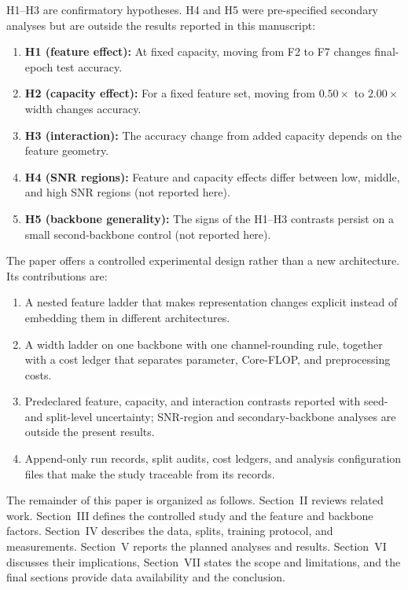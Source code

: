 H1--H3 are confirmatory hypotheses. H4 and H5 were pre-specified secondary
analyses but are outside the results reported in this manuscript:
\begin{enumerate}
  \item \textbf{H1 (feature effect):} At fixed capacity, moving from F2 to F7 changes final-epoch test accuracy.
  \item \textbf{H2 (capacity effect):} For a fixed feature set, moving from $0.50\times$ to $2.00\times$ width changes accuracy.
  \item \textbf{H3 (interaction):} The accuracy change from added capacity depends on the feature geometry.
  \item \textbf{H4 (SNR regions):} Feature and capacity effects differ between low, middle, and high SNR regions (not reported here).
  \item \textbf{H5 (backbone generality):} The signs of the H1--H3 contrasts persist on a small second-backbone control (not reported here).
\end{enumerate}

The paper offers a controlled experimental design rather than a new
architecture. Its contributions are:
\begin{enumerate}
  \item A nested feature ladder that makes representation changes explicit
  instead of embedding them in different architectures.
  \item A width ladder on one backbone with one channel-rounding rule, together
  with a cost ledger that separates parameter, Core-FLOP, and preprocessing
  costs.
  \item Predeclared feature, capacity, and interaction contrasts reported with
  seed- and split-level uncertainty; SNR-region and secondary-backbone analyses
  are outside the present results.
  \item Append-only run records, split audits, cost ledgers, and analysis
  configuration files that make the study traceable from its records.
\end{enumerate}

The remainder of this paper is organized as follows. Section~II reviews
related work. Section~III defines the controlled study and the feature and
backbone factors. Section~IV describes the data, splits, training protocol,
and measurements. Section~V reports the planned analyses and results.
Section~VI discusses their implications, Section~VII states the scope and
limitations, and the final sections provide data availability and the
conclusion.

